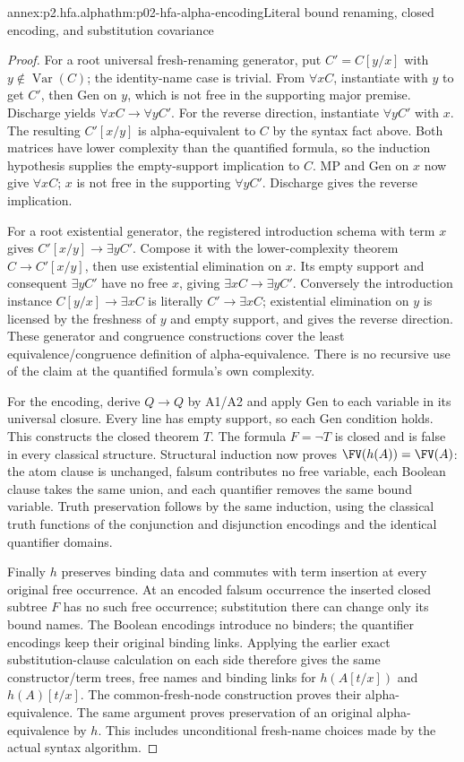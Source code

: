 \begin{annexitem}{annex:p2.hfa.alpha}{thm:p02-hfa-alpha-encoding}{Literal bound renaming, closed encoding, and substitution covariance}
\begin{proof}
For a root universal fresh-renaming generator, put \(C'=C[y/x]\)
with \(y\notin\operatorname{Var}(C)\); the identity-name case is
trivial. From \(\forall xC\), instantiate with \(y\) to get
\(C'\), then Gen on \(y\), which is not free in the supporting
major premise. Discharge yields \(\forall xC\to\forall yC'\).
For the reverse direction, instantiate \(\forall yC'\) with \(x\).
The resulting \(C'[x/y]\) is alpha-equivalent to \(C\) by the
syntax fact above. Both matrices have lower complexity than the
quantified formula, so the induction hypothesis supplies the
empty-support implication to \(C\). MP and Gen on \(x\) now give
\(\forall xC\); \(x\) is not free in the supporting
\(\forall yC'\). Discharge gives the reverse implication.

For a root existential generator, the registered introduction schema
with term \(x\) gives \(C'[x/y]\to\exists yC'\). Compose it
with the lower-complexity theorem \(C\to C'[x/y]\), then use
existential elimination on \(x\). Its empty support and consequent
\(\exists yC'\) have no free \(x\), giving
\(\exists xC\to\exists yC'\). Conversely the introduction
instance \(C[y/x]\to\exists xC\) is literally
\(C'\to\exists xC\); existential elimination on \(y\) is
licensed by the freshness of \(y\) and empty support, and gives
the reverse direction. These generator and congruence constructions
cover the least equivalence/congruence definition of alpha-equivalence.
There is no recursive use of the claim at the quantified formula's
own complexity.

For the encoding, derive \(Q\to Q\) by A1/A2 and apply Gen to
each variable in its universal closure. Every line has empty support,
so each Gen condition holds. This constructs the closed theorem \(T\).
The formula \(F=\neg T\) is closed and is false in every classical
structure. Structural induction now proves \(\FV(h(A))=\FV(A)\):
the atom clause is unchanged, falsum contributes no free variable,
each Boolean clause takes the same union, and each quantifier removes
the same bound variable. Truth preservation follows by the same
induction, using the classical truth functions of the conjunction and
disjunction encodings and the identical quantifier domains.

Finally \(h\) preserves binding data and commutes with term insertion
at every original free occurrence. At an encoded falsum occurrence
the inserted closed subtree \(F\) has no such free occurrence;
substitution there can change only its bound names. The Boolean
encodings introduce no binders; the quantifier encodings keep their
original binding links. Applying the earlier exact substitution-clause
calculation on each side therefore gives the same constructor/term
trees, free names and binding links for \(h(A[t/x])\) and
\(h(A)[t/x]\). The common-fresh-node construction proves their
alpha-equivalence. The same argument proves preservation of an
original alpha-equivalence by \(h\). This includes unconditional
fresh-name choices made by the actual syntax algorithm.
\end{proof}
\end{annexitem}

